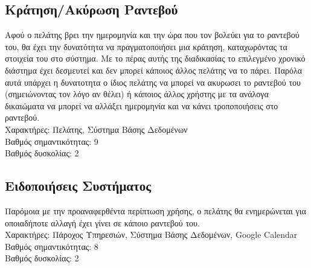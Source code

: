 \documentclass[12pt]{article}
\begin{document}
\subsection{Κράτηση/Ακύρωση Ραντεβού}
Αφού ο πελάτης βρει την ημερομηνία και την ώρα που τον βολεύει για το ραντεβού του, θα έχει την δυνατότητα να πραγματοποιήσει μια κράτηση, καταχωρόντας τα στοιχεία του στο σύστημα. Με το πέρας αυτής της διαδικασίας το επιλεγμένο χρονικό διάστημα έχει δεσμευτεί και δεν μπορεί κάποιος άλλος πελάτης να το πάρει. Παρόλα αυτά υπάρχει η δυνατοτητα ο ίδιος πελάτης να μπορεί να ακυρωσει το ραντεβού του (σημειώνοντας τον λόγο αν θέλει) ή κάποιος άλλος χρήστης με τα ανάλογα δικαιώματα να μπορεί να αλλάξει ημερομηνία και να κάνει τροποποιήσεις στο ραντεβού. 
\\[0.3cm] 
Χαρακτήρες: Πελάτης, Σύστημα Βάσης Δεδομένων
\\[0.3cm]
Βαθμός σημαντικότητας: 9
\\[0.3cm]
Βαθμός δυσκολίας: 2

\subsection{Ειδοποιήσεις Συστήματος}
Παρόμοια με την προαναφερθέντα περίπτωση χρήσης, ο πελάτης θα ενημερώνεται για οποιαδήποτε αλλαγή έχει γίνει σε κάποιο ραντεβού του. 
\\[0.3cm] 
Χαρακτήρες: Πάροχος Υπηρεσιών, Σύστημα Βάσης Δεδομένων, Google Calendar
\\[0.3cm]
Βαθμός σημαντικότητας: 8
\\[0.3cm]
Βαθμός δυσκολίας: 2
\end{document}
